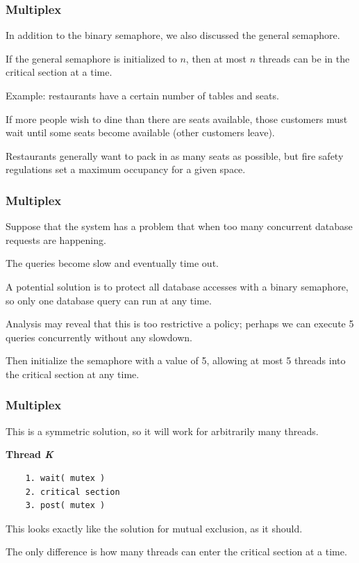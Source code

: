 \begin{frame}
\frametitle{Multiplex}
In addition to the binary semaphore, we also discussed the general semaphore. 

If the general semaphore is initialized to $n$, then at most $n$ threads can be in the critical section at a time. 

Example: restaurants have a certain number of tables and seats. 

If more people wish to dine than there are seats available, those customers must wait until some seats become available (other customers leave). 

Restaurants generally want to pack in as many seats as possible, but fire safety regulations set a maximum occupancy for a given space.

\end{frame}

\begin{frame}
\frametitle{Multiplex}

Suppose that the system has a problem that when too many concurrent database requests are happening. 

The queries become slow and eventually time out. 

A potential solution is to protect all database accesses with a binary semaphore, so only one database query can run at any time. 

Analysis may reveal that this is too restrictive a policy; perhaps we can execute 5 queries concurrently without any slowdown. 

Then initialize the semaphore with a value of 5, allowing at most 5 threads into the critical section at any time.


\end{frame}

\begin{frame}[fragile]
\frametitle{Multiplex}


This is a symmetric solution, so it will work for arbitrarily many threads.

\textbf{Thread \textit{K}}\vspace{-6em}
  \begin{verbatim}
	1. wait( mutex )
	2. critical section
	3. post( mutex )
  \end{verbatim}
\vspace{-2em}

This looks exactly like the solution for mutual exclusion, as it should. 

The only difference is how many threads can enter the critical section at a time.



\end{frame}

